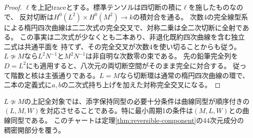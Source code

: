 \begin{proof}
$\ell$を上記traceとする。標準テンソルは四切断の積に$\ell$を施したものなので、
反対切断は$H^0(L^2)\times H^0(M^2)\to k$の積対合を通る。
次数4の完全線型系による楕円四次曲線は二二次式の完全交叉で、対称二乗は全二次切断に全射である。
この事実は二次式が少なくとも二本あり、非退化既約四次曲線を含む独立二式は共通平面を
持てず、その完全交叉が次数4を使い切ることからも従う。
$L\not\simeq M$なら$L^2N^{-1}$と$M^2N^{-1}$は非自明な次数零の束である。
先の鉛筆完全列を$D=L^2$にも適用すると、八次元の両切断空間がそのまま完全に対合する。
従って階数と核は主張通りである。$L=M$なら切断環は通常の楕円四次曲線の環で、
二本の定義式に$a,b$の二次式持ち上げを加えた対称完全交叉になる。
\end{proof}

\begin{theorem}[曲線データの復元と被覆]\label{thm:elliptic-pencil-reconstruction}
$L\not\simeq M$の上記全対象では、添字保持同型の必要十分条件は曲線同型が順序付きの
$(L,M,W)$を対応させることである。特に最小周期1の条件は$(M,L,W)$との曲線同型である。
このチャートは定理\ref{thm:reversible-component}の44次元成分の稠密開部分を覆う。
\end{theorem}
